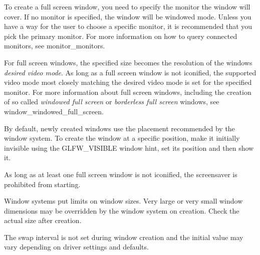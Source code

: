 To create a full screen window, you need to specify the monitor the window will cover. If no monitor is specified, the window will be windowed mode. Unless you have a way for the user to choose a specific monitor, it is recommended that you pick the primary monitor. For more information on how to query connected monitors, see monitor\+\_\+monitors.

For full screen windows, the specified size becomes the resolution of the window\textquotesingle{}s {\itshape desired video mode}. As long as a full screen window is not iconified, the supported video mode most closely matching the desired video mode is set for the specified monitor. For more information about full screen windows, including the creation of so called {\itshape windowed full screen} or {\itshape borderless full screen} windows, see window\+\_\+windowed\+\_\+full\+\_\+screen.

By default, newly created windows use the placement recommended by the window system. To create the window at a specific position, make it initially invisible using the G\+L\+F\+W\+\_\+\+V\+I\+S\+I\+B\+LE window hint, set its position and then show it.

As long as at least one full screen window is not iconified, the screensaver is prohibited from starting.

Window systems put limits on window sizes. Very large or very small window dimensions may be overridden by the window system on creation. Check the actual size after creation.

The swap interval is not set during window creation and the initial value may vary depending on driver settings and defaults.



